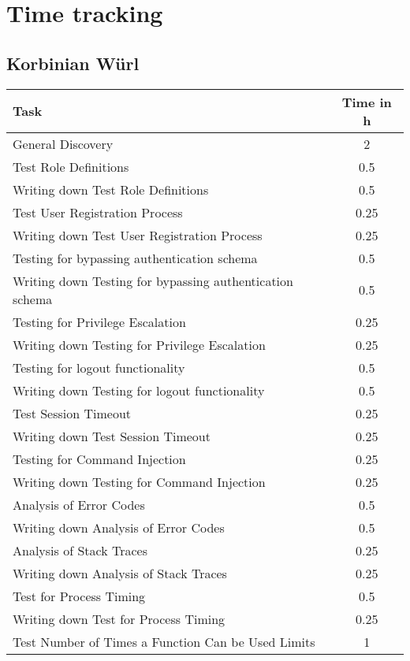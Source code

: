 \chapter{Time tracking}

\section{Korbinian Würl}
\begin{table}[H]
\tiny
\begin{tabular*}{\textwidth}{@{\extracolsep{\fill}} l c@{\extracolsep{0pt}} }
\textbf{Task} & \textbf{Time in h} \\ \hline
	General Discovery							& 2 \\
	Test Role Definitions						& 0.5\\
	Writing down Test Role Definitions			& 0.5\\
	Test User Registration Process				& 0.25\\
	Writing down Test User Registration Process	& 0.25\\
	Testing for bypassing authentication schema & 0.5\\
	Writing down Testing for bypassing authentication schema & 0.5 \\
	Testing for Privilege Escalation			& 0.25\\
	Writing down Testing for Privilege Escalation & 0.25\\
	Testing for logout functionality			& 0.5\\
	Writing down Testing for logout functionality & 0.5 \\
	Test Session Timeout						& 0.25 \\
	Writing down Test Session Timeout			& 0.25 \\
	Testing for Command Injection 				& 0.25 \\
	Writing down Testing for Command Injection 	& 0.25 \\
	Analysis of Error Codes	   					& 0.5\\
	Writing down Analysis of Error Codes	   	& 0.5 \\
	Analysis of Stack Traces 					& 0.25\\
	Writing down Analysis of Stack Traces 		& 0.25 \\
	Test for Process Timing 					& 0.5 \\
	Writing down Test for Process Timing 		& 0.25 \\
	Test Number of Times a Function Can be Used Limits & 1 \\

\end{tabular*}
\end{table}
